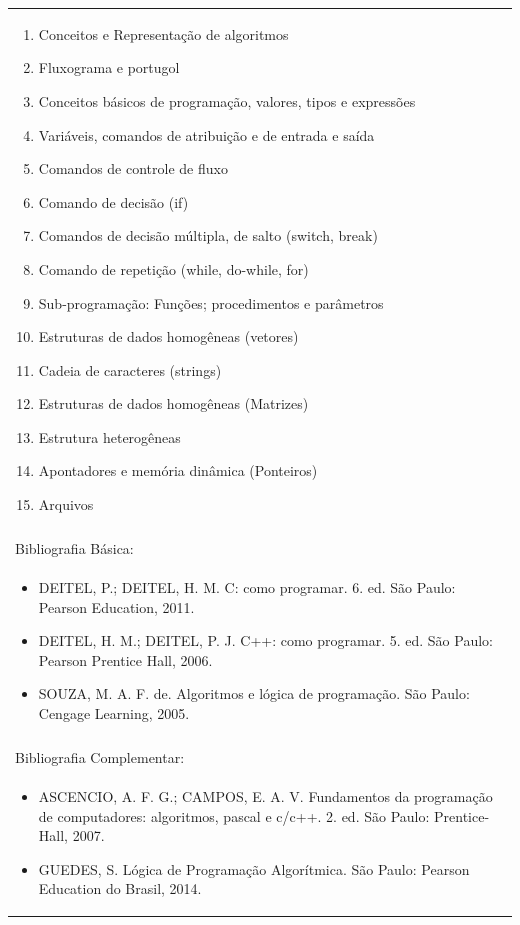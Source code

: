 \documentclass[11pt]{article}
\begin{document}
\begin{center}
\begin{longtable}{|p{4cm}|p{4cm}|p{4cm}|p{4cm}|}
{\begin{enumerate}
\item Conceitos e Representação de algoritmos
\item Fluxograma e portugol
\item Conceitos básicos de programação, valores, tipos e expressões
\item Variáveis, comandos de atribuição e de entrada e saída
\item Comandos de controle de fluxo
\item Comando de decisão (if)
\item Comandos de decisão múltipla, de salto (switch, break)
\item Comando de repetição (while, do-while, for)
\item Sub-programação: Funções; procedimentos e parâmetros
\item Estruturas de dados homogêneas (vetores)
\item Cadeia de caracteres (strings)
\item Estruturas de dados homogêneas (Matrizes)
\item Estrutura heterogêneas
\item Apontadores e memória dinâmica (Ponteiros)
\item Arquivos\end{enumerate}}\\
\multicolumn{4}{|p{16cm}|}{}\\
\hline
\multicolumn{4}{|p{16cm}|}{Bibliografia Básica:}\\
\multicolumn{4}{|p{16cm}|}{%
\begin{itemize}\item DEITEL, P.; DEITEL, H. M. C: como programar. 6. ed. São Paulo: Pearson Education, 2011.
\item DEITEL, H. M.; DEITEL, P. J. C++: como programar. 5. ed. São Paulo: Pearson Prentice Hall, 2006.
\item SOUZA, M. A. F. de. Algoritmos e lógica de programação. São Paulo: Cengage Learning, 2005.\end{itemize}}\\
\multicolumn{4}{|p{16cm}|}{}\\
\hline
\multicolumn{4}{|p{16cm}|}{Bibliografia Complementar:}\\
\multicolumn{4}{|p{16cm}|}{%
\begin{itemize}\item ASCENCIO, A. F. G.; CAMPOS, E. A. V. Fundamentos da programação de computadores: algoritmos, pascal e c/c++. 2. ed. São Paulo: Prentice-Hall, 2007.
\item GUEDES, S. Lógica de Programação Algorítmica. São Paulo: Pearson Education do Brasil, 2014.

\end{itemize}}
\end{longtable}
\end{center}
\end{document}
